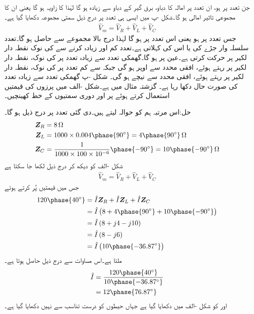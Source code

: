 جن تعدد پر  ہو، ان تعدد پر امالہ کا دباو، برق گیر کے دباو سے زیادہ ہو گا لہٰذا  کا زاویہ  ہو گا یعنی ان کا مجموعی تاثیر امالی ہو گا۔شکل -پ میں ایسی ہی تعدد پر درج ذیل سمتی مجموعہ دکھایا گیا ہے۔
\begin{align*}
\hat{V}_m=\hat{V}_R+\hat{V}_L+\hat{V}_C
\end{align*}
جس تعدد پر  ہو یعنی  اس تعدد پر  ہو گا لہٰذا درج بالا مجموعے سے  حاصل ہو گا۔تعدد  سلسلہ وار جڑے  کی  یا اس کی  کہلاتی ہے۔تعدد کم اور زیادہ کرنے سے  کی نوک نقطہ دار لکیر پر حرکت کرتی ہے۔عین  پر  ہو گا۔گھمکی تعدد سے زیادہ تعدد پر  کی نوک، نقطہ دار لکیر پر رہتے ہوئے، افقی محدد سے اوپر ہو گی جبکہ  سے کم تعدد پر  کی نوک، نقطہ دار لکیر پر رہتے ہوئے، افقی محدد سے نیچے ہو گی۔ شکل -پ  گھمکی تعدد سے زیادہ تعدد کی صورت حال دکھا رہا ہے۔ 
گزشتہ مثال میں  ہے۔شکل -الف میں پرزوں کی قیمتیں استعمال کرتے ہوئے  پر   اور  دوری سمتیوں کے خط کھینچیں۔

حل:اس مرتبہ ہم  کو حوالہ لیتے ہیں۔دی گئی تعدد پر درج ذیل ہو گا۔
\begin{align*}
\bZ_R&=\SI{8}{\ohm}\\
\bZ_L&=1000\times 0.004 \phase{90^{\circ}}=4\phase{90^{\circ}}\, \si{\ohm}\\
\bZ_C&=\frac{1}{1000 \times 100\times 10^{-6}} \phase{-90^{\circ}}=10\phase{-90^{\circ}} \, \si{\ohm}
\end{align*}
شکل -الف کو دیکھ کر درج ذیل لکھا جا سکتا ہے
\begin{align*}
\hat{V}_m=\hat{V}_R+\hat{V}_L+\hat{V}_C
\end{align*}
جس میں قیمتیں پُر کرتے ہوئے
\begin{align*}
120 \phase{40^{\circ}}&=\hat{I} \bZ_R+\hat{I}\bZ_L+\hat{I} \bZ_C\\
&=\hat{I}\left(8+4\phase{90^{\circ}}+10\phase{-90^{\circ}}\right)\\
&=\hat{I}\left(8+j4-j10\right)\\
&=\hat{I}\left(8-j6\right)\\
&=\hat{I} \left(10\phase{-36.87^{\circ}}\right)
\end{align*}
ملتا ہے۔اس مساوات سے درج ذیل حاصل ہوتا ہے۔
\begin{align*}
\hat{I}&=\frac{120\phase{40^{\circ}}}{10\phase{-36.87^{\circ}}}\\
&=12\phase{76.87^{\circ}}
\end{align*}
 اور  کو شکل -الف میں دکھایا گیا ہے جہاں حیطوں کو درست تناسب سے نہیں دکھایا گیا ہے۔

